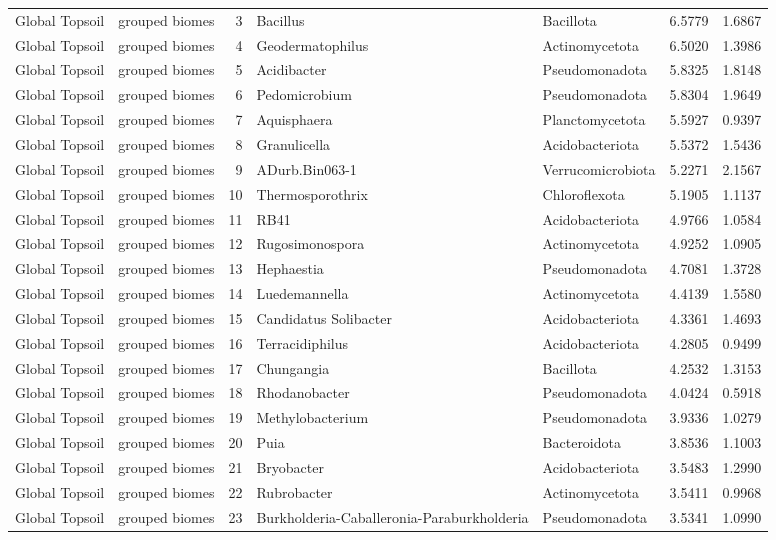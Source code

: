 \documentclass[12pt, oneside]{report}
\begin{document}
\begin{center}
\begin{longtable}{llrp{2.7cm}p{2.2cm}rr}
Global Topsoil & grouped biomes & 3 & Bacillus & Bacillota & 6.5779 & 1.6867 \\
Global Topsoil & grouped biomes & 4 & Geodermatophilus & Actinomycetota & 6.5020 & 1.3986 \\
Global Topsoil & grouped biomes & 5 & Acidibacter & Pseudomonadota & 5.8325 & 1.8148 \\
Global Topsoil & grouped biomes & 6 & Pedomicrobium & Pseudomonadota & 5.8304 & 1.9649 \\
Global Topsoil & grouped biomes & 7 & Aquisphaera & Planctomycetota & 5.5927 & 0.9397 \\
Global Topsoil & grouped biomes & 8 & Granulicella & Acidobacteriota & 5.5372 & 1.5436 \\
Global Topsoil & grouped biomes & 9 & ADurb.Bin063-1 & Verrucomicrobiota & 5.2271 & 2.1567 \\
Global Topsoil & grouped biomes & 10 & Thermosporothrix & Chloroflexota & 5.1905 & 1.1137 \\
Global Topsoil & grouped biomes & 11 & RB41 & Acidobacteriota & 4.9766 & 1.0584 \\
Global Topsoil & grouped biomes & 12 & Rugosimonospora & Actinomycetota & 4.9252 & 1.0905 \\
Global Topsoil & grouped biomes & 13 & Hephaestia & Pseudomonadota & 4.7081 & 1.3728 \\
Global Topsoil & grouped biomes & 14 & Luedemannella & Actinomycetota & 4.4139 & 1.5580 \\
Global Topsoil & grouped biomes & 15 & Candidatus Solibacter & Acidobacteriota & 4.3361 & 1.4693 \\
Global Topsoil & grouped biomes & 16 & Terracidiphilus & Acidobacteriota & 4.2805 & 0.9499 \\
Global Topsoil & grouped biomes & 17 & Chungangia & Bacillota & 4.2532 & 1.3153 \\
Global Topsoil & grouped biomes & 18 & Rhodanobacter & Pseudomonadota & 4.0424 & 0.5918 \\
Global Topsoil & grouped biomes & 19 & Methylobacterium & Pseudomonadota & 3.9336 & 1.0279 \\
Global Topsoil & grouped biomes & 20 & Puia & Bacteroidota & 3.8536 & 1.1003 \\
Global Topsoil & grouped biomes & 21 & Bryobacter & Acidobacteriota & 3.5483 & 1.2990 \\
Global Topsoil & grouped biomes & 22 & Rubrobacter & Actinomycetota & 3.5411 & 0.9968 \\
Global Topsoil & grouped biomes & 23 & Burkholderia-Caballeronia-Paraburkholderia & Pseudomonadota & 3.5341 & 1.0990 \\

\end{longtable}
\end{center}
\end{document}
